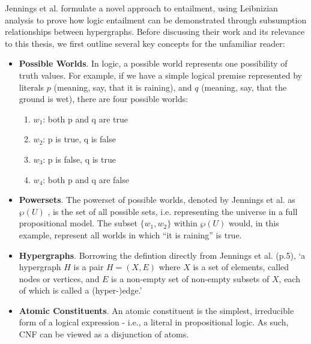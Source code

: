 \documentclass[12pt,twoside]{report}
\begin{document}
Jennings et al. \cite{leibnizianAnalysis} formulate a novel approach to entailment, using Leibnizian analysis to prove how logic entailment can be demonstrated through subsumption relationships between hypergraphs. Before discussing their work and its relevance to this thesis, we first outline several key concepts for the unfamiliar reader: 
\begin{itemize}[itemsep=0pt]
    \item \textbf{Possible Worlds}. In logic, a possible world represents one possibility of truth values. For example, if we have a simple logical premise represented by literals $p$ (meaning, say, that it is raining), and $q$ (meaning, say, that the ground is wet), there are four possible worlds:
    \begin{enumerate}[topsep=0pt, itemsep=0pt]
        \item $w_1$: both p and q are true
        \item $w_2$: p is true, q is false
        \item $w_3$: p is false, q is true
        \item $w_4$: both p and q are false
    \end{enumerate}
    \item \textbf{Powersets}. The powerset of possible worlds, denoted by Jennings et al. as $\wp(U)$ \cite{leibnizianAnalysis}, is the set of all possible sets, i.e. representing the universe in a full propositional model. The subset $\{w_1, w_2\}$ within $\wp(U)$ would, in this example, represent all worlds in which ``it is raining'' is true. 
    \item \textbf{Hypergraphs}. Borrowing the defintion directly from Jennings et al. \cite{leibnizianAnalysis} (p.5), `a hypergraph $H$ is a pair $H=(X, E)$ where $X$ is a set of elements, called nodes or vertices, and $E$ is a non-empty set of non-empty subsets of $X$, each of which is called a (hyper-)edge.' 
    \item \textbf{Atomic Constituents}. An atomic constituent is the simplest, irreducible form of a logical expression - i.e., a literal in propositional logic. As such, CNF can be viewed as a disjunction of atoms.
\end{itemize}
\end{document}
